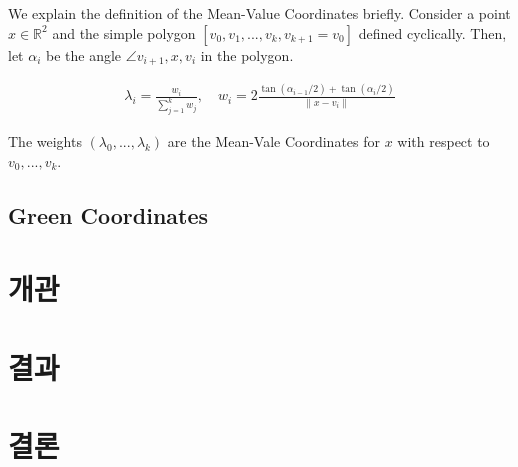 \documentclass[12pt,a4paper,oneside,final]{report}
\providecommand{\norm}[1]{\lVert#1\rVert}
\begin{document}
We explain the definition of the Mean-Value Coordinates briefly. Consider a
point $x \in \mathbb{R}^2$ and the simple polygon $[v_0, v_1, ..., v_k, v_{k+1}
= v_0]$ defined cyclically. Then, let $\alpha_i$ be the angle $\angle
v_{i+1},x,v_{i}$ in the polygon.

\begin{align}
\lambda_i = \frac{w_i}{\sum_{j=1}^{k}w_j}, \quad w_i =
2\frac{\tan(\alpha_{i-1}/2) + \tan(\alpha_{i}/2)}{\norm{x - v_i}}
\end{align}

The weights $(\lambda_0, ..., \lambda_k)$ are the Mean-Vale Coordinates for $x$
with respect to $v_0, ...  , v_k$.

\section{Green Coordinates}

\chapter{개관}

\chapter{결과}

\chapter{결론}

\printbibliography
\end{document}

